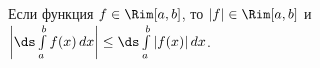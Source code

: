\label{egorr}
    	Если функция $f\in\Rim[a,b]$, то $|f|\in\Rim[a,b]$ и $\bigg|\ds\int\limits_a^bf(x)\,dx\bigg|\leq\ds\int\limits_a^b|f(x)|\,dx$.
    